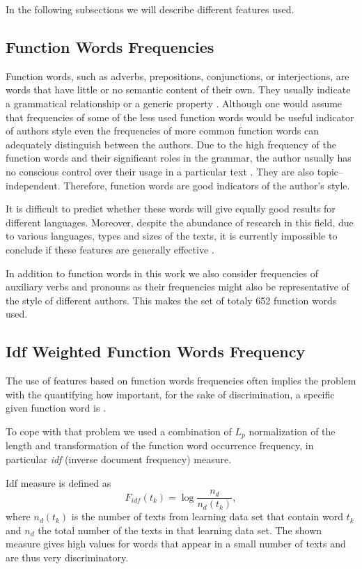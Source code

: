\documentclass{llncs}
\begin{document}
In the following subsections we will describe different features used.

\subsection{Function Words Frequencies}
\label{sec:funkcijske-rijeci}
Function words, such as adverbs, prepositions, conjunctions, or interjections,
are words that have little or no semantic content of their own. They usually
indicate a grammatical relationship or a generic property
\cite{zhao2005effective}. Although one would assume that frequencies of some of
the less used function words would be useful indicator of authors style even the
frequencies of more common function words can adequately distinguish between the
authors. Due to the high frequency of the function words and their significant
roles in the grammar, the author usually has no conscious control over their
usage in a particular text \cite{argamon2005measuring}. They are also
topic--independent. Therefore, function words are good indicators of the author's
style.

It is difficult to predict whether these words will give equally good results for
different languages. Moreover, despite the abundance of research in this field,
due to various languages, types and sizes of the texts, it is currently
impossible to conclude if these features are generally effective
\cite{zhao2005effective}.

In addition to function words in this work we also consider frequencies of
auxiliary verbs and pronouns as their frequencies might also be
representative of the style of different authors. This makes the set of totaly
652 function words used.

\subsection{Idf Weighted Function Words Frequency}
\label{sec:funkcijske-rijeci-idf}

The use of features based on function words frequencies often implies the
problem with the quantifying how important, for the sake of discrimination, a
specific given function word is \cite{diederich2003authorship}.

To cope with that problem we used a combination of $L_p$ normalization of the
length and transformation of the function word occurrence frequency, in
particular \emph{idf} (inverse document frequency) measure.

Idf measure is defined as \cite{diederich2003authorship}
\begin{equation}
F_{idf}(t_k) = \log \frac{n_d}{n_d(t_k)},
\label{equ:idf}
\end{equation}
where $n_d(t_k)$ is the number of texts from learning data set that contain word
$t_k$ and $n_d$ the total number of the texts in that learning data set. The
shown measure gives high values for words that appear in a small number of
texts and are thus very discriminatory.
\end{document}
